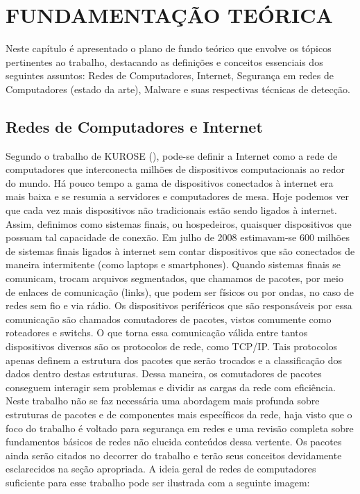 
\chapter{FUNDAMENTAÇÃO TEÓRICA}
\label{c.fundamentacao}

Neste capítulo é apresentado o plano de fundo teórico que envolve os tópicos
pertinentes ao trabalho, destacando as definições e conceitos essenciais dos
seguintes assuntos: Redes de Computadores, Internet, Segurança em redes de
Computadores (estado da arte), Malware e suas respectivas técnicas de
detecção.
\section{Redes de Computadores e Internet}
\label{s.teoria_redes_internet}

Segundo o trabalho de KUROSE (\citeyear{kurose09}), pode-se definir a Internet
como a rede de computadores que interconecta milhões de dispositivos
computacionais ao redor do mundo. Há pouco tempo a gama de dispositivos
conectados à internet era mais baixa e se resumia a servidores e computadores
de mesa. Hoje podemos ver que cada vez mais dispositivos não tradicionais
estão sendo ligados à internet. Assim, definimos como sistemas finais, ou
hospedeiros, quaisquer dispositivos que possuam tal capacidade de conexão. Em
julho de 2008 estimavam-se 600 milhões de sistemas finais ligados à internet
sem contar dispositivos que são conectados de maneira intermitente (como
laptops e smartphones). Quando sistemas finais se comunicam, trocam arquivos
segmentados, que chamamos de pacotes, por meio de enlaces de comunicação
(links), que podem ser físicos ou por ondas, no caso de redes sem fio e via
rádio. Os dispositivos periféricos que são responsáveis por essa comunicação
são chamados comutadores de pacotes, vistos comumente como roteadores e
switchs. O que torna essa comunicação válida entre tantos dispositivos
diversos são os protocolos de rede, como TCP/IP. Tais protocolos apenas
definem a estrutura dos pacotes que serão trocados e a classificação dos dados
dentro destas estruturas. Dessa maneira, os comutadores de pacotes conseguem
interagir sem problemas e dividir as cargas da rede com eficiência. Neste
trabalho não se faz necessária uma abordagem mais profunda sobre estruturas de
pacotes e de componentes mais específicos da rede, haja visto que o foco do
trabalho é voltado para segurança em redes e uma revisão completa sobre
fundamentos básicos de redes não elucida conteúdos dessa vertente. Os pacotes
ainda serão citados no decorrer do trabalho e terão seus conceitos devidamente
esclarecidos na seção apropriada. A ideia geral de redes de computadores
suficiente para esse trabalho pode ser ilustrada com a seguinte imagem:

